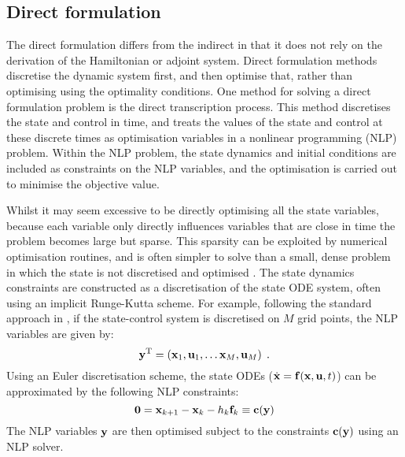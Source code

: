 \subsection{Direct formulation}

The direct formulation differs from the indirect in that it does not rely on the derivation of the Hamiltonian or adjoint system. Direct formulation methods discretise the dynamic system first, and then optimise that, rather than optimising using the optimality conditions. One method for solving a direct formulation problem is the direct transcription process. This method discretises the state and control in time, and treats the values of the state and control at these discrete times as optimisation variables in a nonlinear programming (NLP) problem. Within the NLP problem, the state dynamics and initial conditions are included as constraints on the NLP variables, and the optimisation is carried out to minimise the objective value.

Whilst it may seem excessive to be directly optimising all the state variables, because each variable only directly influences variables that are close in time the problem becomes large but sparse. This sparsity can be exploited by numerical optimisation routines, and is often simpler to solve than a small, dense problem in which the state is not discretised and optimised \citep{betts_practical_2010}. The state dynamics constraints are constructed as a discretisation of the state ODE system, often using an implicit Runge-Kutta scheme. For example, following the standard approach in \citet{betts_practical_2010}, if the state-control system is discretised on $M$ grid points, the NLP variables are given by:
\begin{equation}
    \mathbf{\bm{y}}^\mathrm{T} = \left(\mathbf{\bm{x}}_1, \mathbf{\bm{u}}_1, \ldots \mathbf{\bm{x}}_M, \mathbf{\bm{u}}_M\right)\;.
\end{equation}
Using an Euler discretisation scheme, the state ODEs ($\dot{\mathbf{\bm{x}}} = \mathbf{\bm{f}}(\mathbf{\bm{x}}, \mathbf{\bm{u}}, t)$) can be approximated by the following NLP constraints:
\begin{equation}
    \mathbf{\bm{0}} = \mathbf{\bm{x}}_{k+1} - \mathbf{\bm{x}}_k -h_k\mathbf{\bm{f}}_k \equiv \mathbf{\bm{c}}(\mathbf{\bm{y}})
\end{equation}
The NLP variables $\mathbf{\bm{y}}$ are then optimised subject to the constraints $\mathbf{\bm{c}}(\mathbf{\bm{y}})$ using an NLP solver.

